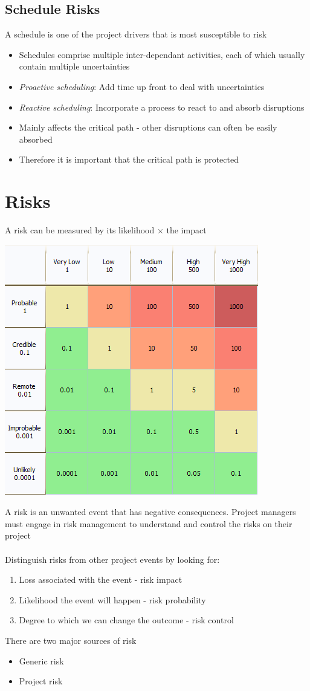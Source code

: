 \documentclass{article}[18pt]
\begin{document}
\subsection{Schedule Risks}
A schedule is one of the project drivers that is most susceptible to risk
\begin{itemize}
	\item Schedules comprise multiple inter-dependant activities, each of which usually contain multiple uncertainties
	\item \textit{Proactive scheduling}: Add time up front to deal with uncertainties
	\item \textit{Reactive scheduling}: Incorporate a process to react to and absorb disruptions
	\item Mainly affects the critical path - other disruptions can often be easily absorbed
	\item Therefore it is important that the critical path is protected
\end{itemize} 
\section{Risks}
A risk can be measured by its likelihood $\times$ the impact 
\begin{center}
	\includegraphics[scale=0.5]{risk}
\end{center}
A risk is an unwanted event that has negative consequences. Project managers must engage in risk management to understand and control the risks on their project\\
\\
Distinguish risks from other project events by looking for:
\begin{enumerate}
	\item Loss associated with the event - risk impact
	\item Likelihood the event will happen - risk probability
	\item Degree to which we can change the outcome - risk control
\end{enumerate}
There are two major sources of risk
\begin{itemize}
	\item Generic risk
	\item Project risk
\end{itemize}
\end{document}

